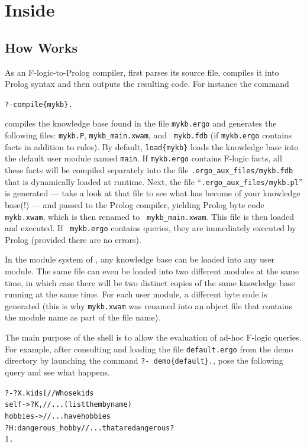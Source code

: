 \documentclass[11pt]{article}
\newcommand{\ERGO}{\mbox{\smaller{\ensuremath{\cal{E}}\smaller{{\sc{RGO}}}}}\xspace}
\newcommand{\FLSYSTEM}{\ERGO}
\newcommand{\ergoext}{ergo\xspace}
\newcommand{\fl}{\mbox{F-logic}\xspace}
\newcommand{\ofile}{xwam}
\begin{document}
\newpage
\section{Inside \FLSYSTEM}

\subsection{How \FLSYSTEM Works}


As an \fl-to-Prolog compiler, \FLSYSTEM first parses its source file,
compiles it into Prolog syntax and then outputs the resulting code. For
instance the command 
\begin{alltt}
    ?- compile\{mykb\}.
\end{alltt}
compiles the knowledge base found in the file {\tt mykb.\ergoext} and generates the
following files: {\tt mykb.P}, {\tt mykb\_main.\ofile}, and {\tt
  mykb.fdb} (if {\tt mykb.\ergoext} contains facts in addition to rules).
By default, {\tt load\{mykb\}} loads the knowledge base into the default user
module named {\tt main}. If {\tt mykb.\ergoext} contains \fl facts, all these
facts will be compiled separately into the file {\tt .ergo\_aux\_files/mykb.fdb} that is
dynamically loaded at runtime.  Next, the file
``\texttt{.ergo\_aux\_files/mykb.pl}''  is generated
--- take a look at that file to see what has become of your
\FLSYSTEM knowledge base(!) --- and passed to the Prolog compiler, yielding Prolog byte
code {\tt mykb.\ofile}, which is then renamed to {\tt
  mykb\_main.\ofile}. This file is then loaded and executed.  If {\tt
  mykb.\ergoext} contains queries, they are immediately executed by Prolog
(provided there are no errors).

In the module system of \FLSYSTEM, any knowledge base can be loaded into any
user module. The same file can even be loaded into two different
modules at the same time, in which case there will be two distinct copies
of the same knowledge base running at the same time. For each user module, a different
byte code is generated (this is why {\tt mykb.\ofile} was renamed into an
object file that contains the module name as part of the file name).

The main purpose of the \FLSYSTEM shell is to allow the evaluation
of ad-hoc \fl queries. For example, after consulting and loading the
file \texttt{default.\ergoext} from the demo directory by launching
the command \texttt{?-~demo\{default\}.}, pose the following query
and see what happens.
\begin{alltt}
 \hspace*{4mm}   ?-  ?X.kids[                       // Whose kids
 \hspace*{15mm}           self -> ?K,             // ... (list them by name)
 \hspace*{15mm}           hobbies ->              // ... have hobbies
 \hspace*{15mm}             ?H:dangerous\_hobby    // ... that are dangerous? 
 \hspace*{10mm}           ]. 
\end{alltt}
\end{document}
